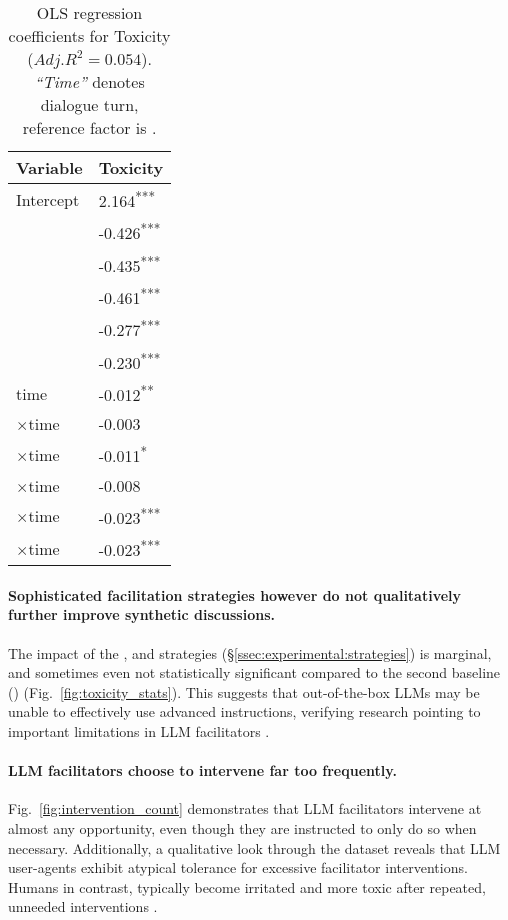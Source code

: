 \begin{table}[t]
	\centering
	\begin{tabular}{l p{2.5cm}}
		\toprule
		\textbf{Variable} & \textbf{Toxicity} \\
		\midrule
		Intercept & 2.164\textsuperscript{***} \\
		\strategynoinstr & -0.426\textsuperscript{***} \\
		\strategymodgame & -0.435\textsuperscript{***} \\
		\strategyrules & -0.461\textsuperscript{***} \\
		\strategyregroom & -0.277\textsuperscript{***} \\
		\strategyconstrcomm & -0.230\textsuperscript{***} \\
		time & -0.012\textsuperscript{**} \\
		\strategynoinstr$\times$time & -0.003 \\
		\strategymodgame$\times$time & -0.011\textsuperscript{*} \\
		\strategyrules$\times$time & -0.008 \\
		\strategyregroom$\times$time & -0.023\textsuperscript{***} \\
		\strategyconstrcomm$\times$time & -0.023\textsuperscript{***} \\
		\bottomrule
	\end{tabular}
	\small
	\asterisknote
	\normalsize
	\caption{\ac{OLS} regression coefficients for Toxicity ($Adj. R^2=0.054$). \textit{“Time”} denotes dialogue turn, reference factor is \emph{\strategynomod}.}
	\label{tab:toxicity}
\end{table}

\paragraph{Sophisticated facilitation strategies however do not qualitatively further improve synthetic discussions.} The impact of the \emph{\strategyrules}, \emph{\strategyregroom} and \emph{\strategyconstrcomm}  strategies (\S\ref{ssec:experimental:strategies}) is marginal, and sometimes even not statistically significant compared to the second baseline (\emph{\strategynoinstr}) (Fig.~\ref{fig:toxicity_stats}). This suggests that out-of-the-box \acp{LLM} may be unable to effectively use advanced instructions, verifying research pointing to important limitations in \ac{LLM} facilitators \cite{cho-etal-2024-language}.

\paragraph{\ac{LLM} facilitators choose to intervene far too frequently.} Fig.~\ref{fig:intervention_count} demonstrates that \ac{LLM} facilitators intervene at almost any opportunity, even though they are instructed to only do so when necessary. Additionally, a qualitative look through the dataset reveals that \ac{LLM} user-agents exhibit atypical tolerance for excessive facilitator interventions. Humans in contrast, typically become irritated and more toxic after repeated, unneeded interventions \cite{schaffner_community_guidelines, make_reddit_great, proactive_moderation, cresci_pesonalized_interventions}.


